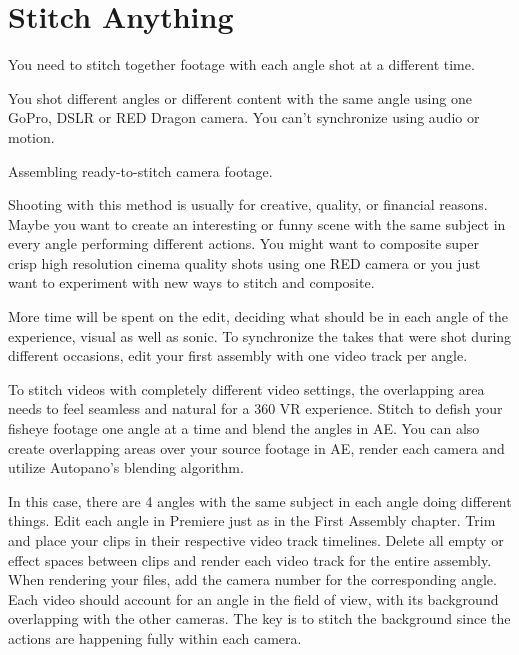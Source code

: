 \section{Stitch Anything}
\pagecolor{white}
\label{chap:49}
\begin{fullwidth}

\problem

{\large You need to stitch together footage with each angle shot at a different time. \par}

You shot different angles or different content with the same angle using one GoPro, DSLR or RED Dragon camera. You can’t synchronize using audio or motion. 

\solution

{\large Assembling ready-to-stitch camera footage. \par}

Shooting with this method is usually for creative, quality, or financial reasons. Maybe you want to create an interesting or funny scene with the same subject in every angle performing different actions. You might want to composite super crisp high resolution cinema quality shots using one RED camera or you just want to experiment with new ways to stitch and composite.

More time will be spent on the edit, deciding what should be in each angle of the experience, visual as well as sonic. To synchronize the takes that were shot during different occasions, edit your first assembly with one video track per angle. 


To stitch videos with completely different video settings, the overlapping area needs to feel seamless and natural for a 360 VR experience. Stitch to defish your fisheye footage one angle at a time and blend the angles in AE. You can also create overlapping areas over your source footage in AE, render each camera and utilize Autopano’s blending algorithm.
\clearpage
{}

In this case, there are 4 angles with the same subject in each angle doing different things. Edit each angle in Premiere just as in the First Assembly chapter. Trim and place your clips in their respective video track timelines. Delete all empty or effect spaces between clips and render each video track for the entire assembly. When rendering your files, add the camera number for the corresponding angle. Each video should account for an angle in the field of view, with its background overlapping with the other cameras. The key is to stitch the background since the actions are happening fully within each camera. 


\clearpage
\end{fullwidth}